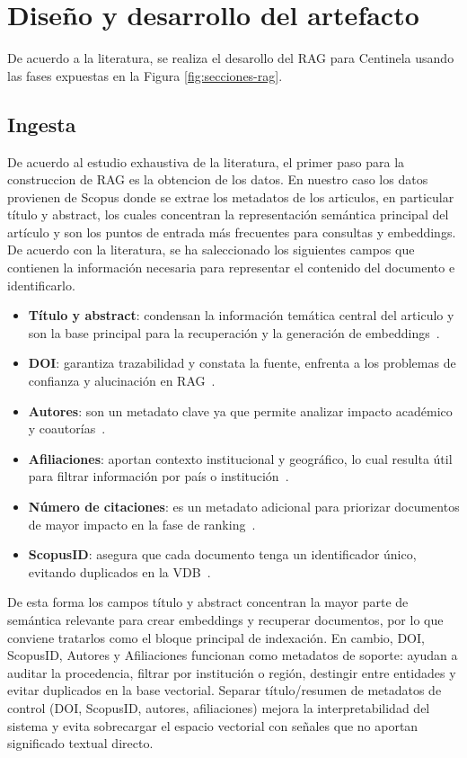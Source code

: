 \section{Diseño y desarrollo del artefacto}
De acuerdo a la literatura, se realiza el desarollo del RAG para Centinela usando las fases expuestas en la Figura \ref{fig:secciones-rag}. 

\subsection{Ingesta} 
De acuerdo al estudio exhaustiva de la literatura, el primer paso para la construccion de RAG es la obtencion de los datos. En nuestro caso
los datos provienen de Scopus donde se extrae los metadatos de los articulos, en particular título y abstract, los cuales concentran la representación semántica principal del artículo y son los puntos 
de entrada más frecuentes para consultas y embeddings\parencite{zhai2024llmIR}. De acuerdo con la literatura, se ha saleccionado los siguientes campos que 
contienen la información necesaria para representar el contenido del documento e identificarlo.

\begin{itemize}
    \item \textbf{Título y abstract}: condensan la información temática central del articulo y son la base principal para la recuperación y la generación de embeddings~\parencite{zhai2024llmIR}.
    \item \textbf{DOI}: garantiza trazabilidad y constata la fuente, enfrenta a los problemas de confianza y alucinación en RAG~\parencite{knollmeyer2024benchmarking}.
    \item \textbf{Autores}: son un metadato clave ya que permite analizar impacto académico y coautorías~\parencite{fan2021pretraining}. 
    \item \textbf{Afiliaciones}: aportan contexto institucional y geográfico, lo cual resulta útil para filtrar información por país o institución~\parencite{ibrihich2022review}.
    \item \textbf{Número de citaciones}: es un metadato adicional para priorizar documentos de mayor impacto en la fase de ranking~\parencite{bernard2025fate}.
    \item \textbf{ScopusID}: asegura que cada documento tenga un identificador único, evitando duplicados en la VDB~\parencite{ma2025vector}. 
\end{itemize}

De esta forma los campos título y abstract concentran la mayor parte de semántica relevante para crear embeddings y recuperar documentos, por lo que conviene tratarlos como el bloque principal de indexación.
En cambio, DOI, ScopusID, Autores y Afiliaciones funcionan como metadatos de soporte: ayudan a auditar la procedencia, filtrar por institución o región, destingir entre entidades y evitar duplicados en la base 
vectorial. Separar título/resumen de metadatos de control (DOI, ScopusID, autores, afiliaciones)  mejora la interpretabilidad del sistema y evita sobrecargar el espacio vectorial 
con señales que no aportan significado textual directo.


